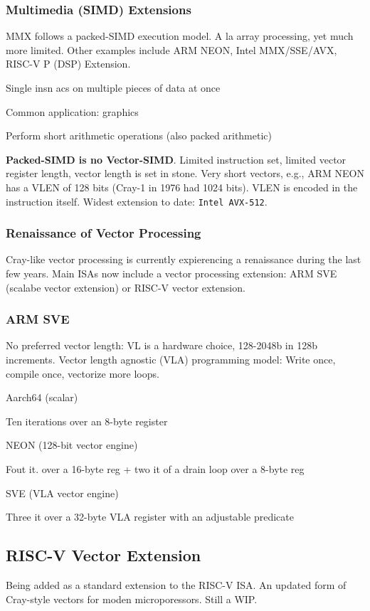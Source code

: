 \documentclass[a4paper, fontsize=8pt, landscape, DIV=1]{scrartcl}
\makeatletter
\renewenvironment{outline}[1][]{%
  \ifthenelse{\equal{#1}{}}{}{\renewcommand{\ol@type}{#1}}%
  \ol@z%
  \newcommand{\0}{\ol@toz\ol@z}%
  \newcommand{\1}{\vspace{\dimexpr\outlinespacingscalar\baselineskip-\baselineskip}\ol@toi\ol@i\item}%
  \newcommand{\2}{\vspace{\dimexpr\outlinespacingscalartwo\baselineskip-\baselineskip}\ol@toii\ol@ii\item}%
  \newcommand{\3}{\vspace{\dimexpr\outlinespacingscalar\baselineskip-\baselineskip}\ol@toiii\ol@iii\item}%
  \newcommand{\4}{\vspace{\dimexpr\outlinespacingscalar\baselineskip-\baselineskip}\ol@toiiii\ol@iiii\item}%
}{%
  \ol@toz\ol@exit%
}
\def\outlinespacingscalar{0.5}
\def\outlinespacingscalartwo{0.5}
\makeatother
\begin{document}
\begin{multicols*}{4}
  \subsubsection{Multimedia (SIMD) Extensions}
  MMX follows a packed-SIMD execution model. A la array processing, yet much more limited.
  Other examples include ARM NEON, Intel MMX/SSE/AVX, RISC-V P (DSP) Extension.
  \begin{outline}
    \1 Single insn acs on multiple pieces of data at once
    \1 Common application: graphics
    \1 Perform short arithmetic operations (also packed arithmetic)
  \end{outline}

  \textbf{Packed-SIMD is no Vector-SIMD}. Limited instruction set, limited
  vector register length, vector length is set in stone. Very short vectors, e.g., ARM NEON 
  has a VLEN of 128 bits (Cray-1 in 1976 had 1024 bits). VLEN is encoded
  in the instruction itself. Widest extension to date: \texttt{Intel AVX-512}.

  \subsubsection{Renaissance of Vector Processing}
  Cray-like vector processing is currently expierencing a renaissance during the last 
  few years. Main ISAs now include a vector processing extension: ARM SVE (scalabe vector
  extension) or RISC-V vector extension.

  \subsubsection{ARM SVE}
  No preferred vector length: VL is a hardware choice, 128-2048b in 128b increments. 
  Vector length agnostic (VLA) programming model: Write once, compile once, vectorize more loops.

  \begin{outline}
    \1 Aarch64 (scalar)
      \2 Ten iterations over an 8-byte register
    \1 NEON (128-bit vector engine)
      \2 Fout it. over a 16-byte reg + two it of a drain loop over a 8-byte reg
    \1 SVE (VLA vector engine)
      \2 Three it over a 32-byte VLA register with an adjustable predicate
  \end{outline}

  \subsection{RISC-V Vector Extension}
  Being added as a standard extension to the RISC-V ISA. An updated form of Cray-style
  vectors for moden microporessors. Still a WIP.


\end{multicols*}
\end{document}
